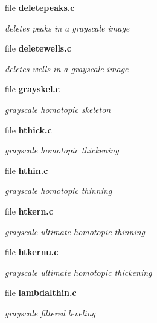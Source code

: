 \begin{CompactItemize}
\item 
file {\bf deletepeaks.c}
\begin{CompactList}\small\item\em deletes peaks in a grayscale image \item\end{CompactList}

\item 
file {\bf deletewells.c}
\begin{CompactList}\small\item\em deletes wells in a grayscale image \item\end{CompactList}

\item 
file {\bf grayskel.c}
\begin{CompactList}\small\item\em grayscale homotopic skeleton \item\end{CompactList}

\item 
file {\bf hthick.c}
\begin{CompactList}\small\item\em grayscale homotopic thickening \item\end{CompactList}

\item 
file {\bf hthin.c}
\begin{CompactList}\small\item\em grayscale homotopic thinning \item\end{CompactList}

\item 
file {\bf htkern.c}
\begin{CompactList}\small\item\em grayscale ultimate homotopic thinning \item\end{CompactList}

\item 
file {\bf htkernu.c}
\begin{CompactList}\small\item\em grayscale ultimate homotopic thickening \item\end{CompactList}

\item 
file {\bf lambdalthin.c}
\begin{CompactList}\small\item\em grayscale filtered leveling \item\end{CompactList}


\end{CompactItemize}
